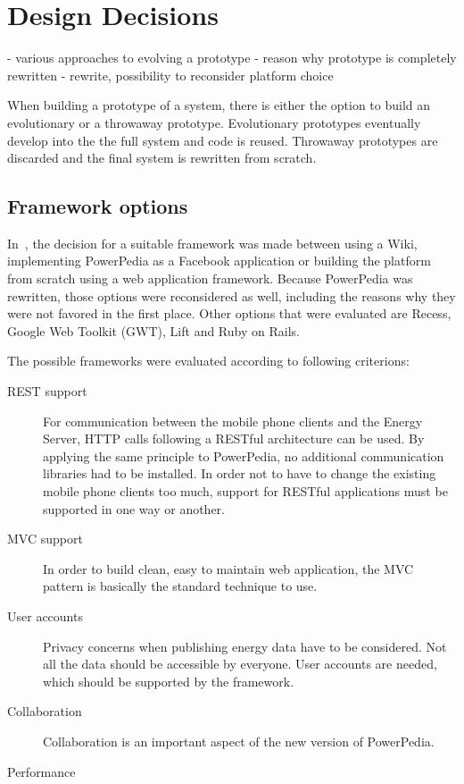 \section{Design Decisions}
- various approaches to evolving a prototype
- reason why prototype is completely rewritten
- rewrite, possibility to reconsider platform choice

When building a prototype of a system, there is either the option to build an evolutionary or a throwaway prototype. Evolutionary prototypes eventually develop into the the full system \cite{interactive_systems} and code is reused. Throwaway prototypes are discarded and the final system is rewritten from scratch. 


\subsection{Framework options}
In~\cite{merklepp}, the decision for a suitable framework was made between using a Wiki, implementing PowerPedia as a Facebook application or building the platform from scratch using a web application framework. 
Because PowerPedia was rewritten, those options were reconsidered as well, including the reasons why they were not favored in the first place. Other options that were evaluated are Recess, Google Web Toolkit (GWT), Lift and Ruby on Rails.  

The possible frameworks were evaluated according to following criterions:
\begin{description}
 \item[REST support] For communication between the mobile phone clients and the Energy Server, HTTP calls following a RESTful architecture can be used. By applying the same principle to PowerPedia, no additional communication libraries had to be installed. In order not to have to change the existing mobile phone clients too much, support for RESTful applications must be supported in one way or another.
 \item[MVC support] In order to build clean, easy to maintain web application, the MVC pattern is basically the standard technique to use. 
 \item[User accounts] Privacy concerns when publishing energy data have to be considered. Not all the data should be accessible by everyone. User accounts are needed, which should be supported by the framework.
 \item[Collaboration] Collaboration is an important aspect of the new version of PowerPedia. 
 \item[Performance] 
\end{description}

